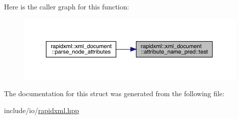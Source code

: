 Here is the caller graph for this function\+:\nopagebreak
\begin{figure}[H]
\begin{center}
\leavevmode
\includegraphics[width=350pt]{structrapidxml_1_1xml__document_1_1attribute__name__pred_a2cf003483847dfabcf0c83877818a4c5_icgraph}
\end{center}
\end{figure}


The documentation for this struct was generated from the following file\+:\begin{DoxyCompactItemize}
\item 
include/io/\mbox{\hyperlink{rapidxml_8hpp}{rapidxml.\+hpp}}\end{DoxyCompactItemize}
